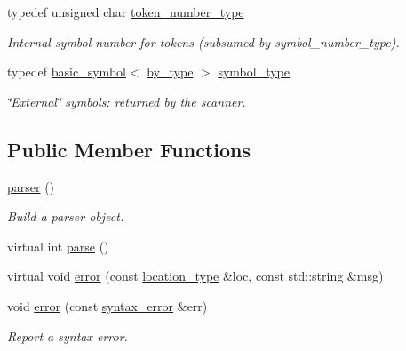 \begin{DoxyCompactItemize}
\mbox{\label{classyy_1_1parser_a9e3963a210d7f2b655d87ca544223ead}} 
typedef unsigned char \hyperlink{classyy_1_1parser_a9e3963a210d7f2b655d87ca544223ead}{token\+\_\+number\+\_\+type}
\begin{DoxyCompactList}\small\item\em Internal symbol number for tokens (subsumed by symbol\+\_\+number\+\_\+type). \end{DoxyCompactList}\item 
\mbox{\label{classyy_1_1parser_aa8024edbba983aa5cd3e88c3a4dcacc9}} 
typedef \hyperlink{structyy_1_1parser_1_1basic__symbol}{basic\+\_\+symbol}$<$ \hyperlink{structyy_1_1parser_1_1by__type}{by\+\_\+type} $>$ \hyperlink{classyy_1_1parser_aa8024edbba983aa5cd3e88c3a4dcacc9}{symbol\+\_\+type}
\begin{DoxyCompactList}\small\item\em \char`\"{}\+External\char`\"{} symbols\+: returned by the scanner. \end{DoxyCompactList}\end{DoxyCompactItemize}
\subsection*{Public Member Functions}
\begin{DoxyCompactItemize}
\item 
\mbox{\label{classyy_1_1parser_a933976dee016ee0623704a75a53551a4}} 
\hyperlink{classyy_1_1parser_a933976dee016ee0623704a75a53551a4}{parser} ()
\begin{DoxyCompactList}\small\item\em Build a parser object. \end{DoxyCompactList}\item 
virtual int \hyperlink{classyy_1_1parser_ac54cad6da907397a978922bfe246e6f8}{parse} ()
\item 
virtual void \hyperlink{classyy_1_1parser_a92436afd3e4c5cea48994c7b5c52b7e0}{error} (const \hyperlink{classyy_1_1parser_a6cee0517f5ed9774dd68ee189b62e454}{location\+\_\+type} \&loc, const std\+::string \&msg)
\item 
\mbox{\label{classyy_1_1parser_a55d4a04712e5fa9f33baed8f92b3eb05}} 
void \hyperlink{classyy_1_1parser_a55d4a04712e5fa9f33baed8f92b3eb05}{error} (const \hyperlink{structyy_1_1parser_1_1syntax__error}{syntax\+\_\+error} \&err)
\begin{DoxyCompactList}\small\item\em Report a syntax error. \end{DoxyCompactList}\end{DoxyCompactItemize}


